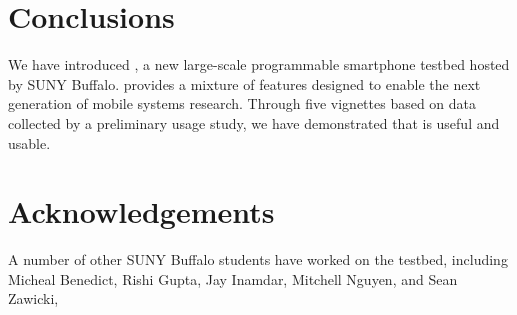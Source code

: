 \section{Conclusions}
\label{sec-conclusions}

We have introduced \PhoneLab{}, a new large-scale programmable smartphone
testbed hosted by SUNY Buffalo. \PhoneLab{} provides a mixture of features
designed to enable the next generation of mobile systems research. Through
five vignettes based on data collected by a preliminary usage study, we have
demonstrated that \PhoneLab{} is useful and usable.

\section*{Acknowledgements}

A number of other SUNY Buffalo students have worked on the \PhoneLab{}
testbed, including Micheal Benedict, Rishi Gupta, Jay Inamdar, Mitchell
Nguyen, and Sean Zawicki, 
